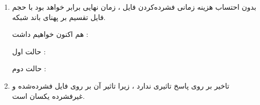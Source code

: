 \begin{boxK}
 \begin{enumerate}
     \item 
    بدون احتساب هزینه زمانی فشرده‌کردن فایل ، زمان نهایی برابر خواهد بود با حجم فایل تقسیم بر پهنای باند شبکه.


    هم اکنون خواهیم داشت : 



    حالت اول :
    

    حالت دوم :
    
 \item 

    تاخیر بر روی پاسخ تاثیری ندارد ، زیرا تاثیر آن بر روی فایل فشرده‌شده و غیرفشرده یکسان است.
 \end{enumerate}
\end{boxK}